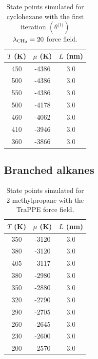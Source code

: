 \documentclass[journal=jctc,manuscript=article]{achemso}
\begin{document}
\begin{table}[htb!]
	\caption{State points simulated for cyclohexane with the first iteration $(\theta^{\langle1\rangle})$ $\lambda_{\rm CH_2} = 20$ force field.}
	\begin{center}
		\begin{tabular}{|c|c|c|}
			\hline
			$T$ (K) & $\mu$ (K) & $L$ (nm) \\ \hline
			450	&	-4386	&	3.0	\\
			500	&	-4386	&	3.0	\\
			550	&	-4386	&	3.0	\\
			500	&	-4178	&	3.0	\\
			460	&	-4062	&	3.0	\\
			410	&	-3946	&	3.0	\\
			360	&	-3866	&	3.0	\\
			\hline
		\end{tabular}
	\end{center}
\end{table}

\newpage
\clearpage

\subsection{Branched alkanes}

\begin{table}[htb!]
	\caption{State points simulated for 2-methylpropane with the TraPPE force field.}
	\begin{center}
		\begin{tabular}{|c|c|c|}
			\hline
			$T$ (K) & $\mu$ (K) & $L$ (nm) \\ \hline
			350	&	-3120	&	3.0	\\
			380	&	-3120	&	3.0	\\
			405	&	-3117	&	3.0	\\
			380	&	-2980	&	3.0	\\
			350	&	-2880	&	3.0	\\
			320	&	-2790	&	3.0	\\
			290	&	-2705	&	3.0	\\
			260	&	-2645	&	3.0	\\
			230	&	-2600	&	3.0	\\
			200	&	-2570	&	3.0	\\
			\hline
		\end{tabular}
	\end{center}
\end{table}
\end{document}
